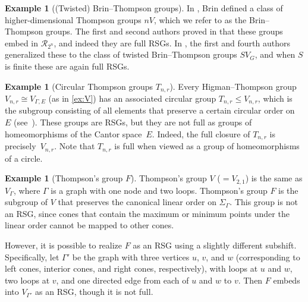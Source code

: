 \documentclass[11pt,letterpaper]{amsart}
\theoremstyle{definition}
\newtheorem{example}[theorem]{Example}
\newcommand{\R}{\mathcal{R}}
\begin{document}
\begin{example}[(Twisted) Brin--Thompson groups]\label{ex:BT}
In \cite{brin04}, Brin defined a class of higher-dimensional Thompson groups $nV$, which we refer to as the Brin--Thompson groups.  The first and second authors proved in \cite{Belk-Bleak-1} that these groups embed in $\R_{2^n}$, and indeed they are full RSGs.  In \cite{BelkZaremskyTwisted}, the first and fourth authors generalized these to the class of twisted Brin--Thompson groups $SV_G$, and when $S$ is finite these are again full RSGs.
\end{example}

\begin{example}[Circular Thompson groups $T_{n,r}$]\label{ex:T}
Every Higman--Thompson group $V_{n,r}\cong V_{\Gamma,E}$ (as in \cref{ex:V}) has an associated circular group $T_{n,r}\leq V_{n,r}$, which is the subgroup consisting of all elements that preserve a certain circular order on~$E$ (see~\cite{Brown}). These groups are RSGs, but they are not full as groups of homeomorphisms of the Cantor space~$E$. Indeed, the full closure of $T_{n,r}$ is precisely~$V_{n,r}$. Note that $T_{n,r}$ is full when viewed as a group of homeomorphisms of a circle.\end{example}

\begin{example}[Thompson's group $F$]\label{ex:F}
Thompson's group $V$ ($=V_{2,1}$) is the same as $V_{\Gamma}$, where $\Gamma$ is a graph with one node and two loops.  Thompson's group $F$ is the subgroup of $V$ that preserves the canonical linear order on $\Sigma_\Gamma$.  This group is not an RSG, since cones that contain the maximum or minimum points under the linear order cannot be mapped to other cones.

However, it is possible to realize $F$ as an RSG using a slightly different subshift.  Specifically, let $\Gamma'$ be the graph with three vertices $u$, $v$, and $w$ (corresponding to left cones, interior cones, and right cones, respectively), with loops at $u$ and $w$, two loops at $v$, and one directed edge from each of $u$ and $w$ to $v$. Then $F$ embeds into $V_{\Gamma'}$ as an RSG, though it is not full.
\end{example}
\end{document}
